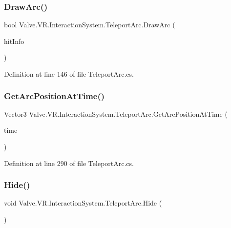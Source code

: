 \subsubsection{\texorpdfstring{DrawArc()}{DrawArc()}}
{\footnotesize\ttfamily bool Valve.\+V\+R.\+Interaction\+System.\+Teleport\+Arc.\+Draw\+Arc (\begin{DoxyParamCaption}\item[{out Raycast\+Hit}]{hit\+Info }\end{DoxyParamCaption})}



Definition at line 146 of file Teleport\+Arc.\+cs.

\mbox{\label{class_valve_1_1_v_r_1_1_interaction_system_1_1_teleport_arc_ae10ae65cd32a5c53fd83863964d7c707}} 
\subsubsection{\texorpdfstring{GetArcPositionAtTime()}{GetArcPositionAtTime()}}
{\footnotesize\ttfamily Vector3 Valve.\+V\+R.\+Interaction\+System.\+Teleport\+Arc.\+Get\+Arc\+Position\+At\+Time (\begin{DoxyParamCaption}\item[{float}]{time }\end{DoxyParamCaption})}



Definition at line 290 of file Teleport\+Arc.\+cs.

\mbox{\label{class_valve_1_1_v_r_1_1_interaction_system_1_1_teleport_arc_a11fef135b72459c18fdb5b7aff0c1fa6}} 
\subsubsection{\texorpdfstring{Hide()}{Hide()}}
{\footnotesize\ttfamily void Valve.\+V\+R.\+Interaction\+System.\+Teleport\+Arc.\+Hide (\begin{DoxyParamCaption}{ }\end{DoxyParamCaption})}



